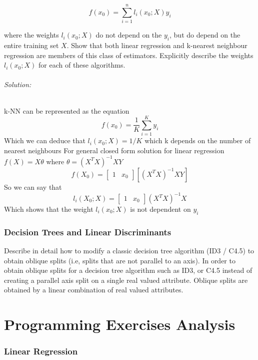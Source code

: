 \documentclass{article}
\begin{document}
$$f(x_0) =\displaystyle\sum\limits_{i=1}^n l_i(x_0; X)y_i
$$

where the weights $l_i(x_0;X)$ do not depend on the $y_i$, but do depend on the entire training set $X$. Show that
both linear regression and k-nearest neighbour regression are members of this class of estimators. 
\newline 
Explicitly describe the weights $l_i(x_0;X)$ for each of these algorithms.

\paragraph {Solution:}
k-NN can be represented as the equation 
$$f(x_0) = \frac{1}{K} \displaystyle\sum\limits_{i =1}^K y_i
$$
Which we can deduce that $l_i (x_0; X)  = 1/K$ which k depends on the number of nearest neighbours 
\newline
For general closed form solution for linear regression
\newline  
 $ f(X) = X\theta  $  where $ \theta = (X^TX)^{-1}XY $
 $$f(X_0) =[\begin{matrix} 1 & x_0 \end{matrix} ][(X^TX)^{-1}XY]$$ 
 So we can say that 
 $$l_i(X_0;X) = [\begin{matrix} 1 & x_0 \end{matrix} ] (X^TX)^{-1}X $$ 
 Which shows that the weight $l_i(x_0;X)$ is not dependent on $y_i$ 
 
 \section{Decision Trees and Linear Discriminants}
 Describe in detail how to modify a classic decision tree algorithm (ID3 / C4.5) to obtain oblique splits (i.e,
splits that are not parallel to an axis).
In order to obtain oblique splits for a decision tree algorithm such as ID3, or C4.5 instead of creating a parallel axis split on a single real valued attribute. Oblique splits are obtained by a linear combination of real valued attributes. 

\part{Programming Exercises Analysis}
\section {Linear Regression} 
\end{document}
